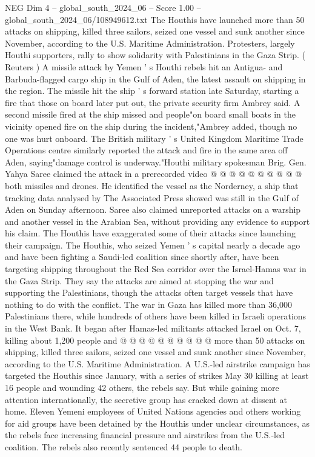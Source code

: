 \begin{textsample}{NEG Dim 4 – global\_south\_2024\_06 – Score 1.00 – global\_south\_2024\_06/108949612.txt}  \label{ex:f4_neg_380}
The Houthis have launched more than 50 attacks on shipping, killed three sailors, seized one vessel and sunk another since November, according to the U.S.
Maritime Administration.
Protesters, largely Houthi supporters, rally to show solidarity with Palestinians in the Gaza Strip. ( Reuters ) A missile attack by Yemen ' s Houthi rebels hit an Antigua- and Barbuda-flagged cargo ship in the Gulf of Aden, the latest assault on shipping in the region.
The missile hit the ship ' s forward station late Saturday, starting a fire that those on board later put out, the private security firm Ambrey said.
A second missile fired at the ship missed and people"on board small boats in the vicinity opened fire on the ship during the incident,"Ambrey added, though no one was hurt onboard.
The British military ' s United Kingdom Maritime Trade Operations centre similarly reported the attack and fire in the same area off Aden, saying"damage control is underway."Houthi military spokesman Brig.
Gen.
Yahya Saree claimed the attack in a prerecorded video @ @ @ @ @ @ @ @ @ @ both missiles and drones.
He identified the vessel as the Norderney, a ship that tracking data analysed by The Associated Press showed was still in the Gulf of Aden on Sunday afternoon.
Saree also claimed unreported attacks on a warship and another vessel in the Arabian Sea, without providing any evidence to support his claim.
The Houthis have exaggerated some of their attacks since launching their campaign.
The Houthis, who seized Yemen ' s capital nearly a decade ago and have been fighting a Saudi-led coalition since shortly after, have been targeting shipping throughout the Red Sea corridor over the Israel-Hamas war in the Gaza Strip.
They say the attacks are aimed at stopping the war and supporting the Palestinians, though the attacks often target vessels that have nothing to do with the conflict.
The war in Gaza has killed more than 36,000 Palestinians there, while hundreds of others have been killed in Israeli operations in the West Bank.
It began after Hamas-led militants attacked Israel on Oct. 7, killing about 1,200 people and @ @ @ @ @ @ @ @ @ @ more than 50 attacks on shipping, killed three sailors, seized one vessel and sunk another since November, according to the U.S.
Maritime Administration.
A U.S.-led airstrike campaign has targeted the Houthis since January, with a series of strikes May 30 killing at least 16 people and wounding 42 others, the rebels say.
But while gaining more attention internationally, the secretive group has cracked down at dissent at home.
Eleven Yemeni employees of United Nations agencies and others working for aid groups have been detained by the Houthis under unclear circumstances, as the rebels face increasing financial pressure and airstrikes from the U.S.-led coalition.
The rebels also recently sentenced 44 people to death.

\end{textsample}
